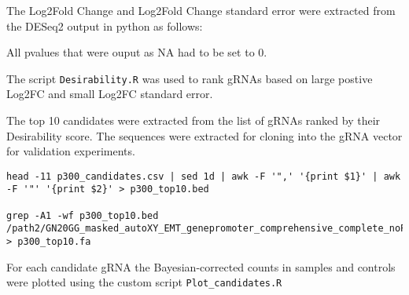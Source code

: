 The Log2Fold Change and Log2Fold Change standard error were extracted from the DESeq2 output in python as follows:


All pvalues that were ouput as NA had to be set to 0.


The script \verb|Desirability.R| was used to rank gRNAs based on large postive Log2FC and small Log2FC standard error.





The top 10 candidates were extracted from the list of gRNAs ranked by their Desirability score. The sequences were extracted for cloning into the gRNA vector for validation experiments.

\begin{small}\begin{lstlisting}
head -11 p300_candidates.csv | sed 1d | awk -F '",' '{print $1}' | awk -F '"' '{print $2}' > p300_top10.bed

grep -A1 -wf p300_top10.bed /path2/GN20GG_masked_autoXY_EMT_genepromoter_comprehensive_complete_noPAM_unique_strand_PAMremoved.fa > p300_top10.fa
\end{lstlisting}\end{small}

For each candidate gRNA the Bayesian-corrected counts in samples and controls were plotted using the custom script \verb|Plot_candidates.R|

